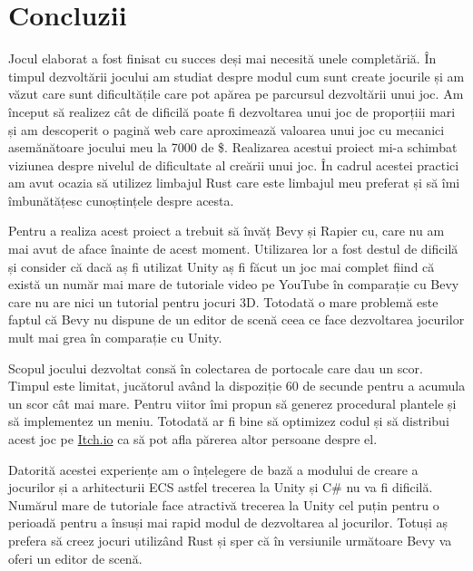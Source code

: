 \clearpage
\section*{Concluzii}

Jocul elaborat a fost finisat cu succes deși mai necesită unele completăriă. În
timpul dezvoltării jocului am studiat despre modul cum sunt create jocurile
și am văzut care sunt dificultățile care pot apărea pe parcursul dezvoltării unui joc. Am început 
să realizez cât de dificilă poate fi dezvoltarea unui joc de proporțiii mari și
am descoperit o pagină web \cite{GameIdea} care aproximează valoarea unui joc
cu mecanici asemănătoare jocului meu la 7000 de \$. Realizarea acestui proiect
mi-a schimbat viziunea despre nivelul de dificultate al creării unui joc. În
cadrul acestei practici am avut ocazia să utilizez limbajul Rust care este
limbajul meu preferat și să îmi îmbunătățesc cunoștințele despre acesta.

Pentru a realiza acest proiect a trebuit să învăț Bevy și Rapier cu, care nu am
mai avut de aface înainte de acest moment. Utilizarea lor a fost destul de
dificilă și consider că dacă aș fi utilizat Unity aș fi făcut un joc mai
complet fiind că există un număr mai mare de tutoriale video pe YouTube în
comparație cu Bevy care nu are nici un tutorial pentru jocuri 3D. Totodată o
mare problemă este faptul că Bevy nu dispune de un editor de scenă ceea ce face
dezvoltarea jocurilor mult mai grea în comparație cu Unity.

Scopul jocului dezvoltat consă în colectarea de portocale care dau un scor.
Timpul este limitat, jucătorul având la dispoziție 60 de secunde pentru a
acumula un scor cât mai mare. Pentru viitor îmi propun să generez procedural 
plantele și să implementez un meniu. Totodată ar fi bine să optimizez codul și
să distribui acest joc pe \href{https://itch.io/}{Itch.io} ca să pot afla
părerea altor persoane despre el.

Datorită acestei experiențe am o înțelegere de bază a modului de creare a jocurilor
și a arhitecturii ECS astfel trecerea la Unity și C\# nu va fi dificilă.
Numărul mare de tutoriale face atractivă trecerea la Unity cel puțin pentru o perioadă pentru a însuși mai rapid modul de dezvoltarea al jocurilor. Totuși aș prefera să creez jocuri utilizând Rust și sper că în versiunile următoare Bevy va oferi un editor de scenă.

